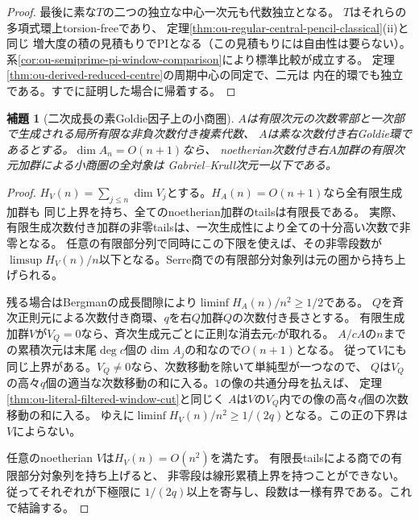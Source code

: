 \documentclass[11pt,a4paper]{ltjsarticle}
\newtheorem{lemma}[theorem]{補題}
\theoremstyle{definition}
\begin{document}
\begin{proof}
最後に素な$T$の二つの独立な中心一次元も代数独立となる。
$T$はそれらの多項式環上torsion-freeであり、
定理\ref{thm:ou-regular-central-pencil-classical}(ii)と同じ
増大度の積の見積もりでPIとなる（この見積もりには自由性は要らない）。
系\ref{cor:ou-semiprime-pi-window-comparison}により標準比較が成立する。
定理\ref{thm:ou-derived-reduced-centre}の周期中心の同定で、二元は
内在的環でも独立である。すでに証明した場合に帰着する。
\end{proof}

\begin{lemma}[二次成長の素Goldie因子上の小商圏]
\label{lem:ou-quadratic-small-dimension}
$A$は有限次元の次数零部と一次部で生成される局所有限な非負次数付き複素代数、
$A$は素な次数付き右Goldie環であるとする。$\dim A_n=O(n+1)$なら、
noetherian次数付き右$A$加群の有限次元加群による小商圏の全対象は
Gabriel--Krull次元一以下である。
\end{lemma}
\begin{proof}
$H_V(n)=\sum_{j\le n}\dim V_j$とする。$H_A(n)=O(n+1)$なら全有限生成加群も
同じ上界を持ち、全てのnoetherian加群のtailsは有限長である。
実際、有限生成次数付き加群の非零tailsは、一次生成性により全ての十分高い次数で非零となる。
任意の有限部分列で同時にこの下限を使えば、その非零段数が
$\limsup H_V(n)/n$以下となる。Serre商での有限部分対象列は元の圏から持ち上げられる。

残る場合はBergmanの成長間隙により$\liminf H_A(n)/n^2\ge1/2$である。
$Q$を斉次正則元による次数付き商環、$q$を右$Q$加群$Q$の次数付き長さとする。
有限生成加群$V$が$V_Q=0$なら、斉次生成元ごとに正則な消去元$c$が取れる。
$A/cA$の$n$までの累積次元は末尾$\deg c$個の$\dim A_j$の和なので$O(n+1)$となる。
従って$V$にも同じ上界がある。$V_Q\ne0$なら、次数移動を除いて単純型が一つなので、
$Q$は$V_Q$の高々$q$個の適当な次数移動の和に入る。$1$の像の共通分母を払えば、
定理\ref{thm:ou-literal-filtered-window-cut}と同じく
$A$は$V$の$V_Q$内での像の高々$q$個の次数移動の和に入る。
ゆえに$\liminf H_V(n)/n^2\ge 1/(2q)$となる。この正の下界は$V$によらない。

任意のnoetherian $V$は$H_V(n)=O(n^2)$を満たす。
有限長tailsによる商での有限部分対象列を持ち上げると、
非零段は線形累積上界を持つことができない。従ってそれぞれが下極限に
$1/(2q)$以上を寄与し、段数は一様有界である。これで結論する。
\end{proof}
\end{document}
